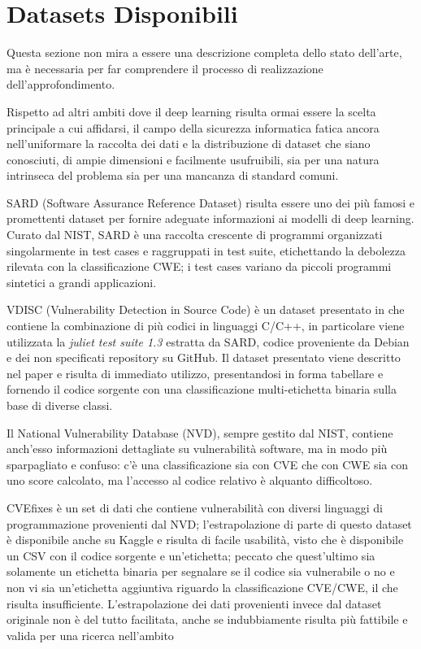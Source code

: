 \documentclass[conference]{IEEEtran}
\begin{document}
\section{Datasets Disponibili}

Questa sezione non mira a essere una descrizione completa dello stato dell'arte, ma è necessaria per far comprendere il processo di realizzazione dell'approfondimento. 

Rispetto ad altri ambiti dove il deep learning risulta ormai essere la scelta principale a cui affidarsi, il campo della sicurezza informatica fatica ancora nell'uniformare la raccolta dei dati e la distribuzione di dataset che siano conosciuti, di ampie dimensioni e facilmente usufruibili, sia per una natura intrinseca del problema sia per una mancanza di standard comuni.

SARD \cite{209211}(Software Assurance Reference Dataset) risulta essere uno dei più famosi e promettenti dataset per fornire adeguate informazioni ai modelli di deep learning.  Curato dal NIST, SARD è una raccolta crescente di programmi organizzati singolarmente in test cases e raggruppati in test suite, etichettando la debolezza rilevata con la classificazione CWE; i test cases variano da piccoli programmi sintetici a grandi applicazioni.

VDISC (Vulnerability Detection in Source Code) è un dataset presentato in \cite{russell2018automatedvulnerabilitydetectionsource} che contiene la combinazione di più codici in linguaggi C/C++, in particolare viene utilizzata la \textit{juliet test suite 1.3} estratta da SARD, codice proveniente da Debian e dei non specificati repository su GitHub. Il dataset presentato viene descritto nel paper e risulta di immediato utilizzo, presentandosi in forma tabellare e fornendo il codice sorgente con una classificazione multi-etichetta binaria sulla base di diverse classi.

Il National Vulnerability Database (NVD), sempre gestito dal NIST, contiene anch'esso informazioni dettagliate su vulnerabilità software, ma in modo più sparpagliato e confuso: c'è una classificazione sia con CVE\cite{cve} che con CWE\cite{cwe} sia con uno score calcolato, ma l'accesso al codice relativo è alquanto difficoltoso.

CVEfixes \cite{bhandari2021:cvefixes} è un set di dati che contiene vulnerabilità con diversi linguaggi di programmazione provenienti dal NVD; l'estrapolazione di parte di questo dataset è disponibile anche su Kaggle e risulta di facile usabilità, visto che è disponibile un CSV con il codice sorgente e un'etichetta; peccato che quest'ultimo sia solamente un etichetta binaria per segnalare se il codice sia vulnerabile o no e non vi sia un'etichetta aggiuntiva riguardo la classificazione CVE/CWE, il che risulta insufficiente. L'estrapolazione dei dati provenienti invece dal dataset originale non è del tutto facilitata, anche se indubbiamente risulta più fattibile e valida per una ricerca nell'ambito
\end{document}
